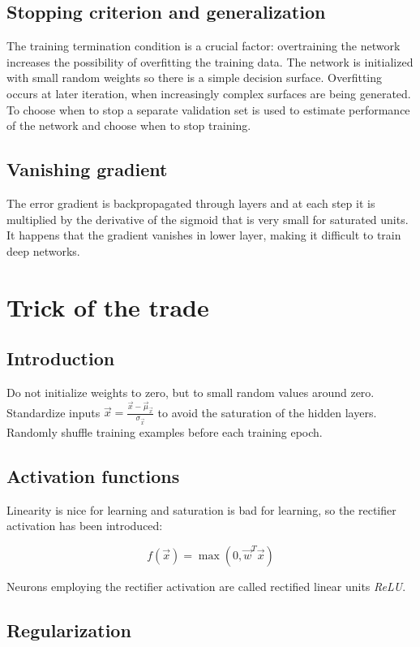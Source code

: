 	\subsection{Stopping criterion and generalization}
	The training termination condition is a crucial factor: overtraining the network increases the possibility of overfitting the training data.
	The network is initialized with small random weights so there is a simple decision surface.
	Overfitting occurs at later iteration, when increasingly complex surfaces are being generated.
	To choose when to stop a separate validation set is used to estimate performance of the network and choose when to stop training.

	\subsection{Vanishing gradient}
	The error gradient is backpropagated through layers and at each step it is multiplied by the derivative of the sigmoid that is very small for saturated units.
	It happens that the gradient vanishes in lower layer, making it difficult to train deep networks.

\section{Trick of the trade}

	\subsection{Introduction}
	Do not initialize weights to zero, but to small random values around zero.
	Standardize inputs $\vec{x} = \frac{\vec{x}-\vec{\mu}_{\vec{x}}}{\sigma_{\vec{x}}}$ to avoid the saturation of the hidden layers.
	Randomly shuffle training examples before each training epoch.

	\subsection{Activation functions}
	Linearity is nice for learning and saturation is bad for learning, so the rectifier activation has been introduced:

	$$f(\vec{x}) = \max(0,\vec{w}^T\vec{x})$$

	Neurons employing the rectifier activation are called rectified linear units \emph{ReLU}.

	\subsection{Regularization}

